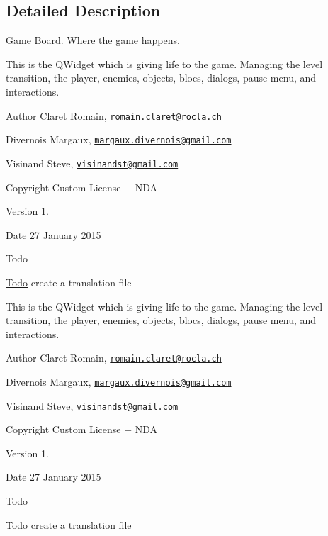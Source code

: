 \subsection{Detailed Description}
Game Board. Where the game happens. 

This is the Q\+Widget which is giving life to the game. Managing the level transition, the player, enemies, objects, blocs, dialogs, pause menu, and interactions. \begin{DoxyAuthor}{Author}
Claret Romain, \href{mailto:romain.claret@rocla.ch}{\tt romain.\+claret@rocla.\+ch} 

Divernois Margaux, \href{mailto:margaux.divernois@gmail.com}{\tt margaux.\+divernois@gmail.\+com} 

Visinand Steve, \href{mailto:visinandst@gmail.com}{\tt visinandst@gmail.\+com} 
\end{DoxyAuthor}
\begin{DoxyCopyright}{Copyright}
Custom License + N\+D\+A 
\end{DoxyCopyright}
\begin{DoxyVersion}{Version}
1. 
\end{DoxyVersion}
\begin{DoxyDate}{Date}
27 January 2015 
\end{DoxyDate}
\begin{DoxyRefDesc}{Todo}
\item[\hyperlink{todo__todo000010}{Todo}]create a translation file \end{DoxyRefDesc}


This is the Q\+Widget which is giving life to the game. Managing the level transition, the player, enemies, objects, blocs, dialogs, pause menu, and interactions. \begin{DoxyAuthor}{Author}
Claret Romain, \href{mailto:romain.claret@rocla.ch}{\tt romain.\+claret@rocla.\+ch} 

Divernois Margaux, \href{mailto:margaux.divernois@gmail.com}{\tt margaux.\+divernois@gmail.\+com} 

Visinand Steve, \href{mailto:visinandst@gmail.com}{\tt visinandst@gmail.\+com} 
\end{DoxyAuthor}
\begin{DoxyCopyright}{Copyright}
Custom License + N\+D\+A 
\end{DoxyCopyright}
\begin{DoxyVersion}{Version}
1. 
\end{DoxyVersion}
\begin{DoxyDate}{Date}
27 January 2015 
\end{DoxyDate}
\begin{DoxyRefDesc}{Todo}
\item[\hyperlink{todo__todo000022}{Todo}]create a translation file \end{DoxyRefDesc}


